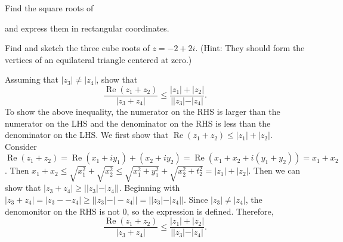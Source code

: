 \documentclass[11pt]{exam}
\newcommand{\ds}{\displaystyle}
\DeclareMathOperator{\re}{Re}
\DeclareMathOperator{\Arg}{Arg}
\begin{document}
\begin{questions}

\question Find the square roots of
and express them in rectangular coordinates.

\question Find and sketch the three cube roots of $z=-2+2i$. (Hint:
They should form the vertices of an equilateral triangle centered at
zero.)

\question Assuming that $|z_3| \ne |z_4|$, show that
\[
  \frac{ \re(z_1+z_2)}{|z_3+z_4|} \le \frac{|z_1| +
    |z_2|}{||z_3|-|z_4|}.
\]
To show the above inequality, the numerator on the RHS is larger than the numerator on the LHS and the denominator on the RHS is less than the denominator on the LHS.
We first show that $\re (z_1 + z_2) \leq |z_1| + |z_2|$.
Consider $\re (z_1 + z_2) = \re (x_1 + iy_1) + (x_2 + iy_2) = \re (x_1 + x_2 + i(y_1 + y_2)) = x_1 + x_2$.
Then $x_1 + x_2 \leq \sqrt{x_1^2} + \sqrt{x_2^2} \leq \sqrt{x_1^2 + y_1^2} + \sqrt{x_2^2 + t_2^2} = |z_1| + |z_2|$.
Then we can show that $|z_3 + z_4| \geq ||z_3| - |z_4||$.
Beginning with $|z_3 + z_4| = |z_3 - -z_4| \geq ||z_3| - |-z_4|| = ||z_3| - |z_4||$.
Since $|z_3| \ne |z_4|$, the denomonitor on the RHS is not 0, so the expression is defined.
Therefore,
\[
  \frac{ \re(z_1+z_2)}{|z_3+z_4|} \le \frac{|z_1| +
    |z_2|}{||z_3|-|z_4|}.
\]


\end{questions}
\end{document}
